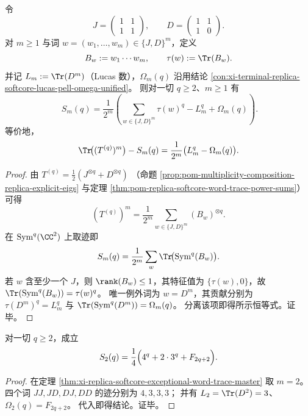 \begin{theorem}\label{thm:xi-replica-softcore-exceptional-word-trace-master}
令
\[
J=\begin{pmatrix}1&1\\1&1\end{pmatrix},\qquad
D=\begin{pmatrix}1&1\\1&0\end{pmatrix}.
\]
对 \(m\ge 1\) 与词 \(w=(w_1,\dots,w_m)\in\{J,D\}^m\)，定义
\[
B_w:=w_1\cdots w_m,\qquad \tau(w):=\Tr(B_w).
\]
并记 \(L_m:=\Tr(D^m)\)（Lucas 数），\(\Omega_m(q)\) 沿用结论
\ref{con:xi-terminal-replica-softcore-lucas-pell-omega-unified}。
则对一切 \(q\ge 2\)、\(m\ge 1\) 有
\[
\boxed{\;
S_m(q)
=\frac1{2^m}\left(\sum_{w\in\{J,D\}^m}\tau(w)^q-L_m^q+\Omega_m(q)\right).}
\]
等价地，
\[
\Tr\!\bigl((T^{(q)})^m\bigr)-S_m(q)
=\frac1{2^m}\bigl(L_m^q-\Omega_m(q)\bigr).
\]
\end{theorem}
\begin{proof}
由
\(
T^{(q)}=\frac12(J^{\otimes q}+D^{\otimes q})
\)
（命题 \ref{prop:pom-multiplicity-composition-replica-explicit-eigs} 与定理
\ref{thm:pom-replica-softcore-word-trace-power-sums}）可得
\[
(T^{(q)})^m
=\frac1{2^m}\sum_{w\in\{J,D\}^m}(B_w)^{\otimes q}.
\]
在 \(\mathrm{Sym}^q(\CC^2)\) 上取迹即
\[
S_m(q)=\frac1{2^m}\sum_{w}\Tr\!\bigl(\mathrm{Sym}^q(B_w)\bigr).
\]
若 \(w\) 含至少一个 \(J\)，则 \(\rank(B_w)\le 1\)，其特征值为 \(\{\tau(w),0\}\)，故
\(
\Tr(\mathrm{Sym}^q(B_w))=\tau(w)^q
\)。
唯一例外词为 \(w=D^m\)，其贡献分别为
\(
\tau(D^m)^q=L_m^q
\)
与
\(
\Tr(\mathrm{Sym}^q(D^m))=\Omega_m(q)
\)。
分离该项即得所示恒等式。证毕。
\end{proof}

\begin{corollary}[二次幂和的闭式补全]\label{cor:xi-replica-softcore-exceptional-power-sum-m2-completion}
对一切 \(q\ge 2\)，成立
\[
S_2(q)=\frac14\Bigl(4^q+2\cdot 3^q+F_{2q+2}\Bigr).
\]
\end{corollary}
\begin{proof}
在定理 \ref{thm:xi-replica-softcore-exceptional-word-trace-master} 取 \(m=2\)。
四个词 \(JJ,JD,DJ,DD\) 的迹分别为 \(4,3,3,3\)；
并有 \(L_2=\Tr(D^2)=3\)、\(\Omega_2(q)=F_{2q+2}\)。
代入即得结论。证毕。
\end{proof}


